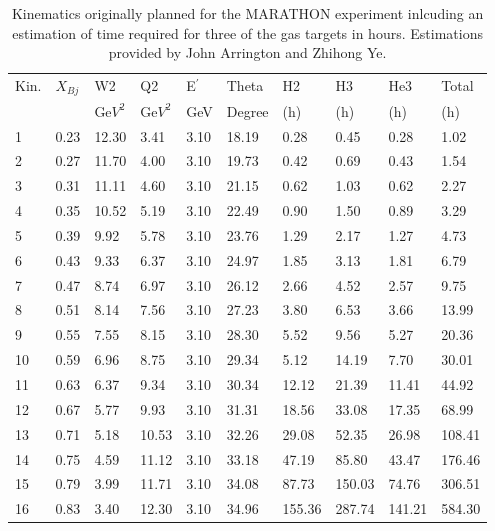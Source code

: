\begin{table}[]
	\begin{tabular}{|l|l|l|l|l|l|l|l|l|l|}
		\hline
		Kin. & $X_{Bj}$& W2    & Q2    & E$^\prime$    & Theta & H2   & H3   & He3   & Total  \\ 
        &&Ge$V^2$&Ge$V^2$& GeV & Degree& (h)& (h)&(h)&(h)  \\ \hline
		1    & 0.23 & 12.30 & 3.41  & 3.10 & 18.19 & 0.28 & 0.45 & 0.28  & 1.02   \\ \hline
		2    & 0.27 & 11.70 & 4.00  & 3.10 & 19.73 & 0.42 & 0.69 & 0.43  & 1.54   \\ \hline
		3    & 0.31 & 11.11 & 4.60  & 3.10 & 21.15 & 0.62 & 1.03 & 0.62  & 2.27   \\ \hline
		4    & 0.35 & 10.52 & 5.19  & 3.10 & 22.49 & 0.90 & 1.50 & 0.89  & 3.29   \\ \hline
		5    & 0.39 & 9.92  & 5.78  & 3.10 & 23.76 & 1.29 & 2.17 & 1.27  & 4.73   \\ \hline
		6    & 0.43 & 9.33  & 6.37  & 3.10 & 24.97 & 1.85 & 3.13 & 1.81  & 6.79   \\ \hline
		7    & 0.47 & 8.74  & 6.97  & 3.10 & 26.12 & 2.66 & 4.52 & 2.57  & 9.75   \\ \hline
		8    & 0.51 & 8.14  & 7.56  & 3.10 & 27.23 & 3.80 & 6.53 & 3.66  & 13.99  \\ \hline
		9    & 0.55 & 7.55  & 8.15  & 3.10 & 28.30 & 5.52 & 9.56 & 5.27  & 20.36  \\ \hline
		10   & 0.59 & 6.96  & 8.75  & 3.10 & 29.34 & 5.12 & 14.19& 7.70  & 30.01  \\ \hline
		11   & 0.63 & 6.37  & 9.34  & 3.10 & 30.34 & 12.12& 21.39& 11.41 & 44.92  \\ \hline
		12   & 0.67 & 5.77  & 9.93  & 3.10 & 31.31 & 18.56& 33.08& 17.35 & 68.99  \\ \hline
		13   & 0.71 & 5.18  & 10.53 & 3.10 & 32.26 & 29.08& 52.35& 26.98 & 108.41 \\ \hline
		14   & 0.75 & 4.59  & 11.12 & 3.10 & 33.18 & 47.19& 85.80& 43.47 & 176.46 \\ \hline
		15   & 0.79 & 3.99  & 11.71 & 3.10 & 34.08 & 87.73&150.03& 74.76 & 306.51 \\ \hline
		16   & 0.83 & 3.40  & 12.30 & 3.10 & 34.96 &155.36&287.74&141.21 & 584.30 \\ \hline
	\end{tabular}
	\caption{Kinematics originally planned for the MARATHON experiment inlcuding an estimation of time required for three of the gas targets in hours. Estimations provided by John Arrington and Zhihong Ye\cite{RateEst}. }
	\label{OldKT}
\end{table}
